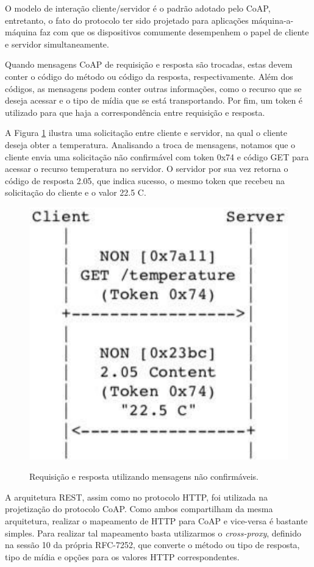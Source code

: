 O modelo de interação cliente/servidor é o padrão adotado pelo CoAP, entretanto,
o fato do protocolo ter sido projetado para aplicações máquina-a-máquina faz com que os dispositivos comumente desempenhem o papel de cliente e servidor simultaneamente.

Quando mensagens CoAP de requisição e resposta são trocadas, estas devem conter o código do método ou código da resposta, respectivamente.
Além dos códigos, as mensagens podem conter outras informações, como o recurso que se deseja acessar e o tipo de mídia que se está transportando.
Por fim, um token é utilizado para que haja a correspondência entre requisição e resposta.

A Figura \ref{fig:fig4} ilustra uma solicitação entre cliente e servidor, na qual o cliente deseja obter a temperatura.
Analisando a troca de mensagens, notamos que o cliente envia uma solicitação não confirmável com token 0x74 e código GET para acessar o recurso temperatura no servidor.
O servidor por sua vez retorna o código de resposta 2.05, que indica sucesso, o mesmo token que recebeu na solicitação do cliente e o valor 22.5 C.


\begin{figure}[htb!]
    \centering\includegraphics[height=.5\textwidth]{fig4.pdf}
    \caption
    {\label{fig:fig4} Requisição e resposta utilizando mensagens não confirmáveis.} \cite{rfc7252}
\end{figure}

A arquitetura REST, assim como no protocolo HTTP\cite{rfc2616}, foi utilizada na projetização do protocolo CoAP.
Como ambos compartilham da mesma arquitetura, realizar o mapeamento de HTTP para CoAP e vice-versa é bastante simples.
Para realizar tal mapeamento basta utilizarmos o \textit{cross-proxy}, definido na sessão 10 da própria RFC-7252\cite{rfc7252},
que converte o método ou tipo de resposta, tipo de mídia e opções para os valores HTTP correspondentes.

